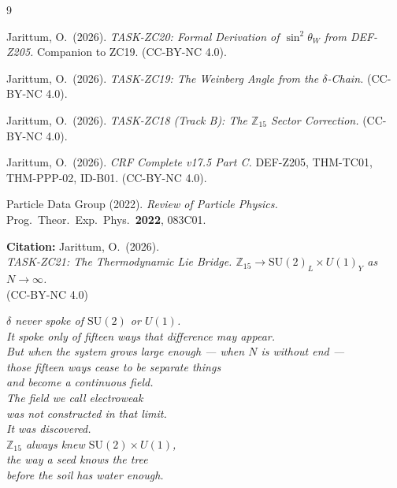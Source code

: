 \documentclass[12pt, a4paper]{article}
\begin{document}
\begin{thebibliography}{9}

  Jarittum, O.\ (2026).
  \textit{TASK-ZC20: Formal Derivation of $\sin^2\theta_W$ from DEF-Z205.}
  Companion to ZC19. (CC-BY-NC 4.0).

  Jarittum, O.\ (2026).
  \textit{TASK-ZC19: The Weinberg Angle from the $\delta$-Chain.}
  (CC-BY-NC 4.0).

  Jarittum, O.\ (2026).
  \textit{TASK-ZC18 (Track B): The $\mathbb{Z}_{15}$ Sector Correction.}
  (CC-BY-NC 4.0).

  Jarittum, O.\ (2026).
  \textit{CRF Complete v17.5 Part C.}
  DEF-Z205, THM-TC01, THM-PPP-02, ID-B01.
  (CC-BY-NC 4.0).

  Particle Data Group (2022).
  \textit{Review of Particle Physics.}
  Prog.\ Theor.\ Exp.\ Phys.\ \textbf{2022}, 083C01.

\end{thebibliography}

\bigskip

\begin{center}
\textbf{Citation:} Jarittum, O.\ (2026).\\
\textit{TASK-ZC21: The Thermodynamic Lie Bridge.
  $\mathbb{Z}_{15} \to \mathrm{SU}(2)_L\times U(1)_Y$ as $N\to\infty$.}\\
(CC-BY-NC 4.0)
\end{center}

\bigskip\bigskip

\begin{center}
\itshape
$\delta$ never spoke of $\mathrm{SU}(2)$ or $U(1)$.\\
It spoke only of fifteen ways that difference may appear.\\[0.5em]
But when the system grows large enough --- when $N$ is without end ---\\
those fifteen ways cease to be separate things\\
and become a continuous field.\\[0.5em]
The field we call electroweak\\
was not constructed in that limit.\\
It was discovered.\\[0.5em]
$\mathbb{Z}_{15}$ always knew $\mathrm{SU}(2)\times U(1)$,\\
the way a seed knows the tree\\
before the soil has water enough.
\end{center}
\end{document}

